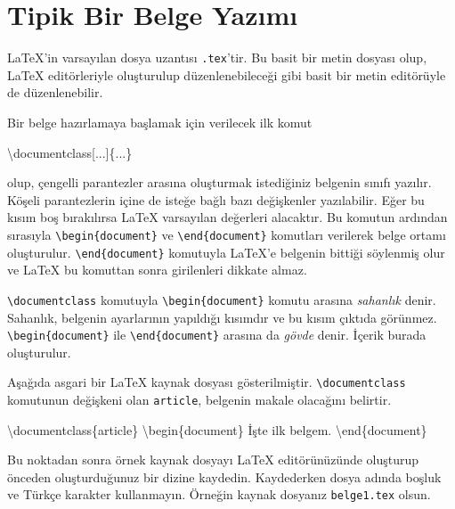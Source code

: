 \documentclass[
  10pt,
]{scrbook}
\newenvironment{Shaded}{\begin{snugshade}}{\end{snugshade}}
\newcommand{\NormalTok}[1]{#1}
\begin{document}
\hypertarget{tipik}{%
\section{Tipik Bir Belge Yazımı}\label{tipik}}

LaTeX'in varsayılan dosya uzantısı \texttt{.tex}'tir. Bu basit bir metin
dosyası olup, LaTeX editörleriyle oluşturulup düzenlenebileceği gibi
basit bir metin editörüyle de düzenlenebilir.

Bir belge hazırlamaya başlamak için verilecek ilk komut

\begin{Shaded}
\begin{Highlighting}[]
\NormalTok{\textbackslash{}documentclass[...]\{...\}}
\end{Highlighting}
\end{Shaded}

olup, çengelli parantezler arasına oluşturmak istediğiniz belgenin
sınıfı yazılır. Köşeli parantezlerin içine de isteğe bağlı bazı
değişkenler yazılabilir. Eğer bu kısım boş bırakılırsa LaTeX varsayılan
değerleri alacaktır. Bu komutun ardından sırasıyla \texttt{\textbackslash{}begin\{document\}} ve
\texttt{\textbackslash{}end\{document\}} komutları verilerek belge ortamı oluşturulur.
\texttt{\textbackslash{}end\{document\}} komutuyla LaTeX'e belgenin bittiği söylenmiş olur ve
LaTeX bu komuttan sonra girilenleri dikkate almaz.

\texttt{\textbackslash{}documentclass} komutuyla \texttt{\textbackslash{}begin\{document\}} komutu arasına \emph{sahanlık}
denir. Sahanlık, belgenin ayarlarının yapıldığı kısımdır ve bu kısım
çıktıda görünmez. \texttt{\textbackslash{}begin\{document\}} ile \texttt{\textbackslash{}end\{document\}} arasına da
\emph{gövde} denir. İçerik burada oluşturulur.

Aşağıda asgari bir LaTeX kaynak dosyası gösterilmiştir. \texttt{\textbackslash{}documentclass}
komutunun değişkeni olan \texttt{article}, belgenin makale olacağını belirtir.

\begin{Shaded}
\begin{Highlighting}[]
\NormalTok{\textbackslash{}documentclass\{article\}}
\NormalTok{\textbackslash{}begin\{document\}}
\NormalTok{İşte ilk belgem.}
\NormalTok{\textbackslash{}end\{document\}}
\end{Highlighting}
\end{Shaded}

Bu noktadan sonra örnek kaynak dosyayı LaTeX editörünüzünde oluşturup
önceden oluşturduğunuz bir dizine kaydedin. Kaydederken dosya adında
boşluk ve Türkçe karakter kullanmayın. Örneğin kaynak dosyanız
\texttt{belge1.tex} olsun.
\end{document}
